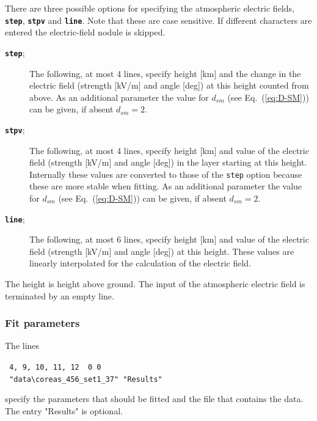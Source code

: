 \documentclass[pdftex,dvipsnames,usenames,fleqn,12pt]{article}
\def\eqref#1{Eq.~(\ref{eq:#1})}
\newcommand*{\seclab}[1]{\label{sec:#1}}
\begin{document}
\bigskip
There are three possible options for specifying the atmospheric electric fields, {\tt\bf step}, {\tt\bf stpv} and {\tt\bf line}. Note that these are case sensitive. If different characters are entered the electric-field nodule is skipped.
\begin{description}
\item[{\tt\bf step};] The following, at most 4 lines, specify height [km] and the change in the electric field (strength [kV/m] and angle [deg]) at this height counted from above. As an additional parameter the value for $d_{sm}$ (see \eqref{D-SM}) can be given, if absent $d_{sm}=2$.
\item[{\tt\bf stpv};] The following, at most 4 lines, specify height [km] and value of the electric field (strength [kV/m] and angle [deg]) in the layer starting at this height. Internally these values are converted to those of the {\tt step} option because these are more stable when fitting. As an additional parameter the value for $d_{sm}$ (see \eqref{D-SM}) can be given, if absent $d_{sm}=2$.
\item[{\tt\bf line};] The following, at most 6 lines, specify height [km] and value of the electric field (strength [kV/m] and angle [deg]) at this height. These values are linearly interpolated for the calculation of the electric field.
\end{description}
The height is height above ground. The input of the atmospheric electric field is terminated by an empty line.

\subsubsection{Fit parameters}\seclab{FitPar}

The lines

\begin{linenumbers}\resetlinenumber[18]
\noindent\verb< 4, 9, 10, 11, 12  0 0<
\\\verb< "data\coreas_456_set1_37" "Results"<
\end{linenumbers}
specify the parameters that should be fitted and the file that contains the data. The entry "Results" is optional.
\end{document}

